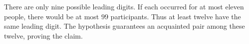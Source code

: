 There are only nine possible leading digits. If each occurred for at most eleven people, there would be at most $99$ participants. Thus at least twelve have the same leading digit. The hypothesis guarantees an acquainted pair among these twelve, proving the claim.
